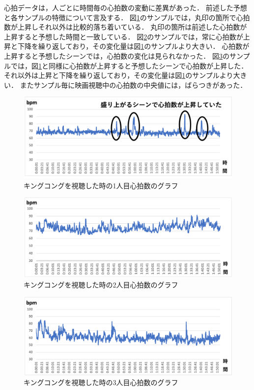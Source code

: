 心拍データは，人ごとに時間毎の心拍数の変動に差異があった．
前述した予想と各サンプルの特徴について言及する．
図\ref{hitorime}のサンプルでは，丸印の箇所で心拍数が上昇しそれ以外は比較的落ち着いている．
丸印の箇所は前述した心拍数が上昇すると予想した時間と一致している．
図\ref{sannninme}のサンプルでは，常に心拍数が上昇と下降を繰り返しており，その変化量は図\ref{hitorime}のサンプルより大きい．
心拍数が上昇すると予想したシーンでは，心拍数の変化は見られなかった．
図\ref{futarime}のサンプルでは，図\ref{hitorime}と同様に心拍数が上昇すると予想したシーンで心拍数が上昇した．
それ以外は上昇と下降を繰り返しており，その変化量は図\ref{hitorime}のサンプルより大きい．
またサンプル毎に映画視聴中の心拍数の中央値には，ばらつきがあった．

\begin{figure}[H]
    \centering
    \includegraphics[width=16cm]{images/chapter3/gurafusyuusei.png}
    \caption{キングコングを視聴した時の1人目心拍数のグラフ}
    \label{hitorime}
\end{figure}

\begin{figure}[H]
    \centering
    \includegraphics[width=16cm]{images/chapter3/gurafu1.png}
    \caption{キングコングを視聴した時の2人目心拍数のグラフ}
    \label{sannninme}
\end{figure}

\begin{figure}[H]
    \centering
    \includegraphics[width=16cm]{images/chapter3/gurafu.png}
    \caption{キングコングを視聴した時の3人目心拍数のグラフ}
    \label{futarime}
\end{figure}

